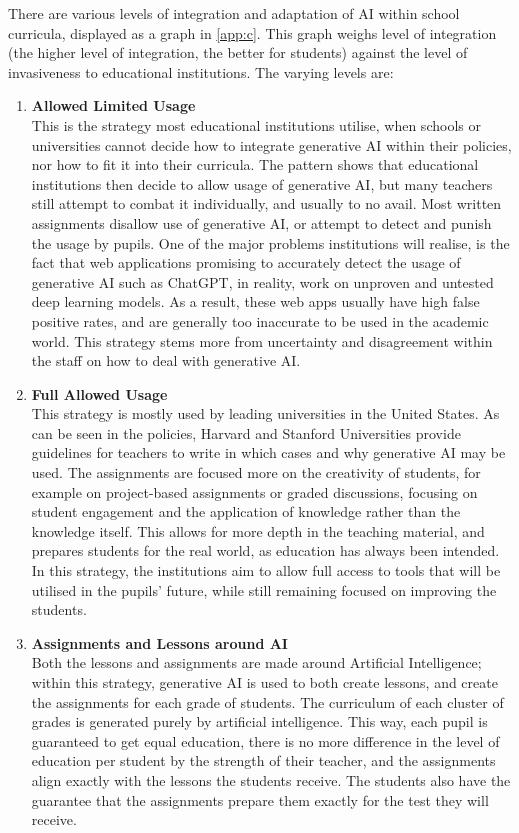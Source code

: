 \documentclass[a4paper,12pt]{report}
\begin{document}
There are various levels of integration and adaptation of AI within school curricula, displayed as a graph in \ref{app:c}. This graph weighs level of integration (the higher level of integration, the better for students) against the level of invasiveness to educational institutions. The varying levels are:
\begin{enumerate}
    \item{\textbf{Allowed Limited Usage}}\\
    This is the strategy most educational institutions utilise, when schools or universities cannot decide how to integrate generative AI within their policies, nor how to fit it into their curricula. The pattern shows that educational institutions then decide to allow usage of generative AI, but many teachers still attempt to combat it individually, and usually to no avail. Most written assignments disallow use of generative AI, or attempt to detect and punish the usage by pupils. One of the major problems institutions will realise, is the fact that web applications promising to accurately detect the usage of generative AI such as ChatGPT, in reality, work on unproven and untested deep learning models. As a result, these web apps usually have high false positive rates, and are generally too inaccurate to be used in the academic world. This strategy stems more from uncertainty and disagreement within the staff on how to deal with generative AI.
    \item{\textbf{Full Allowed Usage}}\\
    This strategy is mostly used by leading universities in the United States. As can be seen in the policies, Harvard and Stanford Universities provide guidelines for teachers to write in which cases and why generative AI may be used. The assignments are focused more on the creativity of students, for example on project-based assignments or graded discussions, focusing on student engagement and the application of knowledge rather than the knowledge itself. This allows for more depth in the teaching material, and prepares students for the real world, as education has always been intended. In this strategy, the institutions aim to allow full access to tools that will be utilised in the pupils' future, while still remaining focused on improving the students.\newpage
    \item{\textbf{Assignments and Lessons around AI}}\\
    Both the lessons and assignments are made around Artificial Intelligence; within this strategy, generative AI is used to both create lessons, and create the assignments for each grade of students. The curriculum of each cluster of grades is generated purely by artificial intelligence. This way, each pupil is guaranteed to get equal education, there is no more difference in the level of education per student by the strength of their teacher, and the assignments align exactly with the lessons the students receive. The students also have the guarantee that the assignments prepare them exactly for the test they will receive.

\end{enumerate}
\end{document}

